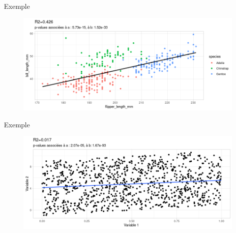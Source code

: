 \documentclass{beamer}
\begin{document}
\begin{frame}{Exemple}

\begin{figure}
\includegraphics[width=\linewidth]{img/reglin_example1.png}
\end{figure}

\end{frame}


\begin{frame}{Exemple}

\begin{figure}
\includegraphics[width=\linewidth]{img/reglin_example2.png}
\end{figure}

\end{frame}
\end{document}
